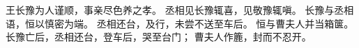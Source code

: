 
\switchcolumn*[\section{}]

王长豫为人谨顺，事亲尽色养之孝。
丞相见长豫辄喜，见敬豫辄嗔。
长豫与丞相语，恒以慎密为端。
丞相还台，及行，未尝不送至车后。
恒与曹夫人并当箱箧。
长豫亡后，丞相还台，登车后，哭至台门；
曹夫人作簏，封而不忍开。

\switchcolumn



